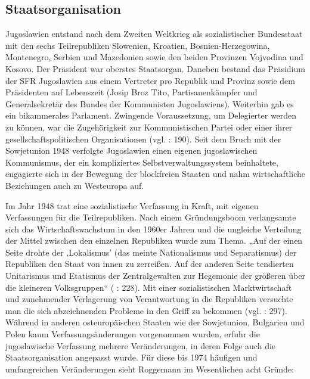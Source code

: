 \subsection{Staatsorganisation }
Jugoslawien entstand nach dem Zweiten Weltkrieg als sozialistischer Bundesstaat mit den sechs Teilrepubliken Slowenien, Kroatien, Bosnien-Herzegowina, Montenegro, Serbien und Mazedonien sowie den beiden Provinzen Vojvodina und Kosovo. Der Präsident war oberstes Staatsorgan. Daneben bestand das Präsidium der SFR Jugoslawien aus einem Vertreter pro Republik und Provinz sowie dem Präsidenten auf Lebenszeit (Josip Broz Tito, Partisanenkämpfer und Generalsekretär des Bundes der Kommunisten Jugoslawiens). Weiterhin gab es ein bikammerales Parlament. Zwingende Voraussetzung, um Delegierter werden zu können, war die Zugehörigkeit zur Kommunistischen Partei oder einer ihrer gesellschaftspolitischen Organisationen (vgl. \cite{toepfer} : 190). Seit dem Bruch mit der Sowjetunion 1948 verfolgte Jugoslawien einen eigenen jugoslawischen Kommunismus, der ein kompliziertes Selbstverwaltungssystem beinhaltete, engagierte sich in der Bewegung der blockfreien Staaten und nahm wirtschaftliche Beziehungen auch zu Westeuropa auf.\par
Im Jahr 1948 trat eine sozialistische Verfassung in Kraft, mit eigenen Verfassungen für die Teilrepubliken. Nach einem Gründungsboom verlangsamte sich das Wirtschaftswachstum in den 1960er Jahren und die ungleiche Verteilung der Mittel zwischen den einzelnen Republiken wurde zum Thema. „Auf der einen Seite drohte der ‚Lokalismus’ (das meinte Nationalismus und Separatismus) der Republiken den Staat von innen zu zerreißen. Auf der anderen Seite tendierten Unitarismus und Etatismus der Zentralgewalten zur Hegemonie der größeren über die kleineren Volksgruppen“ (\cite{calic10} : 228). Mit einer sozialistischen Marktwirtschaft und zunehmender Verlagerung von Verantwortung in die Republiken versuchte man die sich abzeichnenden Probleme in den Griff zu bekommen (vgl. \cite{ramet} : 297). Während in anderen osteuropäischen Staaten wie der Sowjetunion, Bulgarien und Polen kaum Verfassungsänderungen vorgenommen wurden, erfuhr die jugoslawische Verfassung mehrere Veränderungen, in deren Folge auch die Staatsorganisation angepasst wurde. Für diese bis 1974 häufigen und umfangreichen Veränderungen sieht Roggemann im Wesentlichen acht Gründe:

